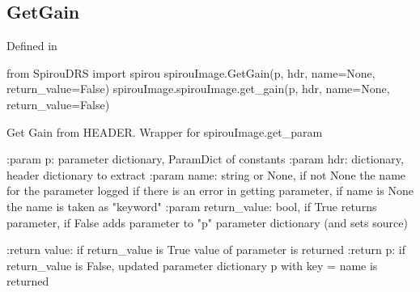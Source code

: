\begin{minipage}{\textwidth}
\subsection{GetGain}

Defined in \spirouImage{}

\begin{pythonbox}
from SpirouDRS import spirou
spirouImage.GetGain(p, hdr, name=None, return_value=False)
spirouImage.spirouImage.get_gain(p, hdr, name=None, return_value=False)
\end{pythonbox}

\begin{pythondocstring}
Get Gain from HEADER. Wrapper for spirouImage.get_param

:param p: parameter dictionary, ParamDict of constants
:param hdr: dictionary, header dictionary to extract
:param name: string or None, if not None the name for the parameter
             logged if there is an error in getting parameter, if name is
             None the name is taken as "keyword"
:param return_value: bool, if True returns parameter, if False adds
                     parameter to "p" parameter dictionary (and sets source)

:return value: if return_value is True value of parameter is returned
:return p: if return_value is False, updated parameter dictionary p with
           key = name is returned
\end{pythondocstring}
\end{minipage}


